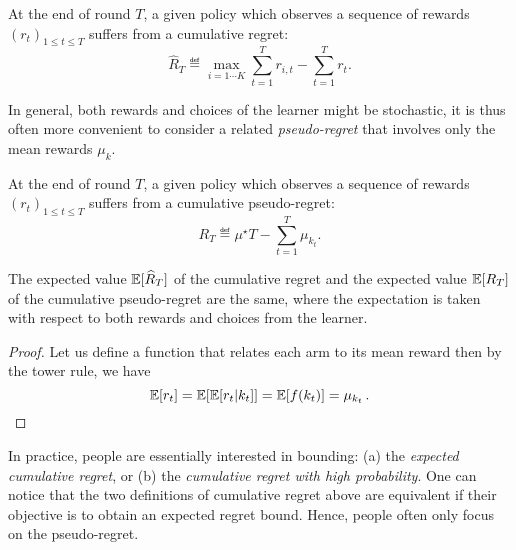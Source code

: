 \begin{definition}\label{def:mab.cumulative_regret}
\begin{leftbar}[defnbar]
	At the end of round $T$, a given policy which observes a sequence of rewards $(r_t)_{1 \leq t \leq T}$ suffers from a cumulative regret:
	\[
		\hat{R}_T \eqdef \max_{i=1\cdots K} \sum_{t=1}^T r_{i,t} - \sum_{t=1}^T r_t.
	\]
\end{leftbar}
\end{definition}

In general, both rewards and choices of the learner might be stochastic, it is thus often more convenient to consider a related \emph{pseudo-regret} that involves only the mean rewards $\mu_k$.

\begin{definition}\label{def:mab.pseudo_regret}
\begin{leftbar}[defnbar]
	At the end of round $T$, a given policy which observes a sequence of rewards $(r_t)_{1 \leq t \leq T}$ suffers from a cumulative pseudo-regret:
	\[
		R_T \eqdef \mu^{\star}T - \sum_{t=1}^T \mu_{k_t}.
	\]
\end{leftbar}
\end{definition}

\begin{proposition}\label{prop:mab.pseudo_regret}
\begin{leftbar}[propositionbar]
	The expected value $\mathbb{E}[\widehat{R}_T]$ of the cumulative regret and the expected value $\mathbb{E}[R_T]$ of the cumulative pseudo-regret are the same, where the expectation is taken with respect to both rewards and choices from the learner.
\end{leftbar}
\end{proposition}

\begin{proof}
	Let us define a function that relates each arm to its mean reward  then by the tower rule, we have
    \[
	    \mathbb{E}[r_t] = \mathbb{E}[\mathbb{E}[r_t|k_t]] = \mathbb{E}[f(k_t)] = \mu_{k_t}\,.
    \]
\end{proof}

In practice, people are essentially interested in bounding: (a) the \emph{expected cumulative regret}, or (b) the \emph{cumulative regret with high probability}. One can notice that the two definitions of cumulative regret above are equivalent if their objective is to obtain an expected regret bound. Hence, people often only focus on the pseudo-regret. 


